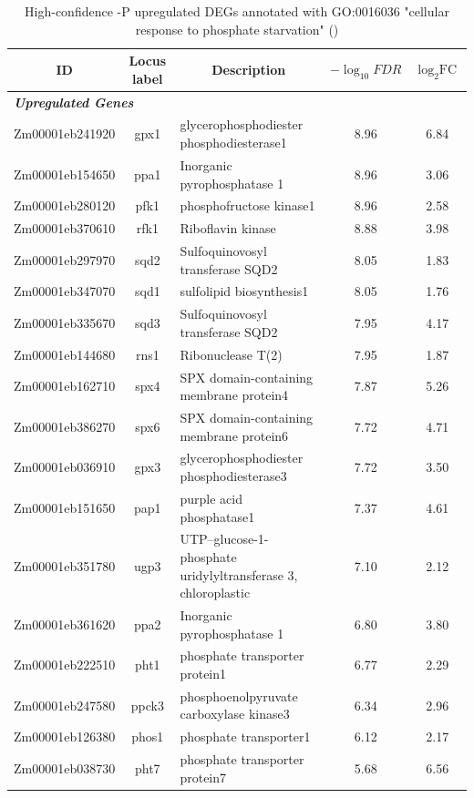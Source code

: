 \documentclass[9pt,twocolumn,twoside]{rilabRxiv}
\begin{document}
\begin{table}[h!]
\centering
\footnotesize
\caption{High-confidence -P upregulated DEGs annotated with GO:0016036 "cellular response to phosphate starvation" (\cite{fattel2024})}
\label{table::PSRupDEGs}
\begin{tabular}{ccp{7.5cm}cc}
\hline
\textbf{ID} & \textbf{Locus label} & \multicolumn{1}{c}{\textbf{Description}} & \textbf{$-\log_{10}{\textit{FDR}}$} & \textbf{$\log_2{\text{FC}}$}\\
\hline
\multicolumn{5}{l}{\textit{\textbf{Upregulated Genes}}} \\
\hline
Zm00001eb241920 & gpx1 & glycerophosphodiester phosphodiesterase1 & 8.96 & 6.84\\
Zm00001eb154650 & ppa1 & Inorganic pyrophosphatase 1 & 8.96 & 3.06\\
Zm00001eb280120 & pfk1 & phosphofructose kinase1 & 8.96 & 2.58\\
Zm00001eb370610 & rfk1 & Riboflavin kinase & 8.88 & 3.98\\
Zm00001eb297970 & sqd2 & Sulfoquinovosyl transferase SQD2 & 8.05 & 1.83\\
Zm00001eb347070 & sqd1 & sulfolipid biosynthesis1 & 8.05 & 1.76\\
Zm00001eb335670 & sqd3 & Sulfoquinovosyl transferase SQD2 & 7.95 & 4.17\\
Zm00001eb144680 & rns1 & Ribonuclease T(2) & 7.95 & 1.87\\
Zm00001eb162710 & spx4 & SPX domain-containing membrane protein4 & 7.87 & 5.26\\
Zm00001eb386270 & spx6 & SPX domain-containing membrane protein6 & 7.72 & 4.71\\
Zm00001eb036910 & gpx3 & glycerophosphodiester phosphodiesterase3 & 7.72 & 3.50\\
Zm00001eb151650 & pap1 & purple acid phosphatase1 & 7.37 & 4.61\\
Zm00001eb351780 & ugp3 & UTP--glucose-1-phosphate uridylyltransferase 3, chloroplastic & 7.10 & 2.12\\
Zm00001eb361620 & ppa2 & Inorganic pyrophosphatase 1 & 6.80 & 3.80\\
Zm00001eb222510 & pht1 & phosphate transporter protein1 & 6.77 & 2.29\\
Zm00001eb247580 & ppck3 & phosphoenolpyruvate carboxylase kinase3 & 6.34 & 2.96\\
Zm00001eb126380 & phos1 & phosphate transporter1 & 6.12 & 2.17\\
Zm00001eb038730 & pht7 & phosphate transporter protein7 & 5.68 & 6.56\\

\end{tabular}
\end{table}
\end{document}
